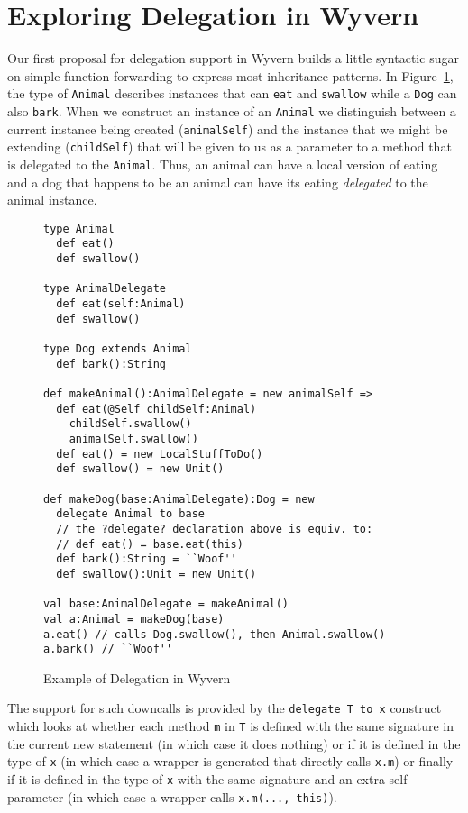 \documentclass[preprint]{sigplanconf}
\begin{document}
\section{Exploring Delegation in Wyvern}

Our first proposal for delegation support in Wyvern builds a little syntactic sugar on simple function forwarding to express most inheritance patterns.  In Figure~\ref{f:wyvern-delegation}, the type of \texttt{Animal} describes instances that can \texttt{eat} and \texttt{swallow} while a \texttt{Dog} can also \texttt{bark}. When we construct an instance of an \texttt{Animal} we distinguish between a current instance being created (\texttt{animalSelf}) and the instance that we might be extending (\texttt{childSelf}) that will be given to us as a parameter to a method that is delegated to the \texttt{Animal}. Thus, an animal can have a local version of eating and a dog that happens to be an animal can have its eating \textit{delegated} to the animal instance.

\begin{figure}
\begin{lstlisting}
type Animal
  def eat()
  def swallow()

type AnimalDelegate
  def eat(self:Animal)
  def swallow()

type Dog extends Animal
  def bark():String

def makeAnimal():AnimalDelegate = new animalSelf =>
  def eat(@Self childSelf:Animal)
    childSelf.swallow()
    animalSelf.swallow()
  def eat() = new LocalStuffToDo()
  def swallow() = new Unit()

def makeDog(base:AnimalDelegate):Dog = new
  delegate Animal to base
  // the ?delegate? declaration above is equiv. to:
  // def eat() = base.eat(this)
  def bark():String = ``Woof''
  def swallow():Unit = new Unit()

val base:AnimalDelegate = makeAnimal()
val a:Animal = makeDog(base)
a.eat() // calls Dog.swallow(), then Animal.swallow()
a.bark() // ``Woof''
\end{lstlisting}
\caption{Example of Delegation in Wyvern}
\label{f:wyvern-delegation}
\end{figure}

The support for such downcalls is provided by the \texttt{delegate T to x} construct which looks at whether each method \texttt{m} in \texttt{T} is defined with the same signature in the current new statement (in which case it does nothing) or if it is defined in the type of \texttt{x} (in which case a wrapper is generated that directly calls \texttt{x.m}) or finally if it is defined in the type of \texttt{x} with the same signature and an extra self parameter (in which case a wrapper calls \texttt{x.m(..., this)}).
\end{document}
